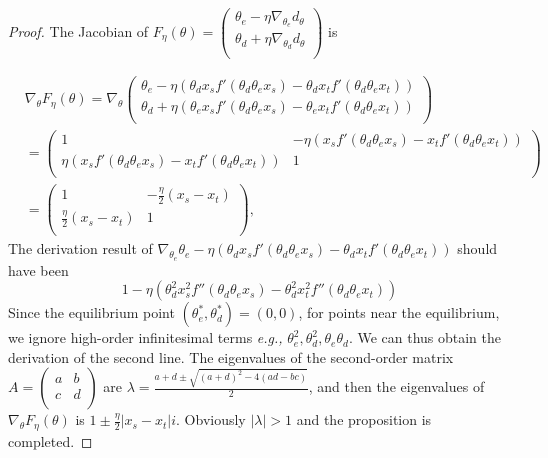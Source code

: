 \documentclass{article} \usepackage{iclr2023_conference,times}
\newcommand{\eg}[0]{\textit{e.g., }}
\begin{document}
\begin{proof}
The Jacobian of $F_\eta(\theta)=\left(         \begin{array}{c} 
    \theta_e-\eta\nabla_{\theta_e}d_{\theta} \\ 
    \theta_d+\eta\nabla_{\theta_d}d_{\theta}\\ 
  \end{array}\right)$ is
 
 \begin{equation}
 \begin{aligned}
&\nabla_{\theta}F_\eta(\theta)=\nabla_{\theta}\left(         \begin{array}{c} 
    \theta_e-\eta\left(\theta_dx_sf'(\theta_d\theta_ex_s)-\theta_dx_tf'(\theta_d\theta_ex_t)\right) \\ 
    \theta_d+\eta\left(\theta_ex_sf'(\theta_d\theta_ex_s)-\theta_ex_tf'(\theta_d\theta_ex_t)\right)\\ 
  \end{array}\right)\\
 &=\left(         \begin{array}{cc} 
    1&-\eta\left(x_sf'(\theta_d\theta_ex_s)-x_tf'(\theta_d\theta_ex_t)\right) \\ 
    \eta\left(x_sf'(\theta_d\theta_ex_s)-x_tf'(\theta_d\theta_ex_t)\right)&1\\ 
  \end{array}\right)\\
  &=\left(         \begin{array}{cc} 
    1&-\frac{\eta}{2}\left(x_s-x_t\right) \\ 
    \frac{\eta}{2}\left(x_s-x_t\right)&1\\ 
  \end{array}\right),
 \end{aligned}
\end{equation}
The derivation result of $\nabla_{\theta_e} \theta_e-\eta\left(\theta_dx_sf'(\theta_d\theta_ex_s)-\theta_dx_tf'(\theta_d\theta_ex_t)\right)$ should have been 
\begin{equation}
    1-\eta\left(\theta^2_dx^2_sf''(\theta_d\theta_ex_s)-\theta^2_dx^2_tf''(\theta_d\theta_ex_t)\right)
\end{equation}
Since the equilibrium point $(\theta_e^*,\theta_d^*)=(0,0)$, for points near the equilibrium, we ignore high-order infinitesimal terms \eg  $\theta_e^2,\theta_d^2,\theta_e\theta_d$. We can thus obtain the derivation of the second line. The eigenvalues of the second-order matrix $A=\left(         \begin{array}{cc} 
    a&b \\ 
    c&d\\ 
  \end{array}\right)$ 
are $\lambda=\frac{a+d\pm\sqrt{(a+d)^2-4(ad-bc)}}{2}$, and then the eigenvalues of $\nabla_{\theta}F_\eta(\theta)$ is $1\pm \frac{\eta}{2}|x_s-x_t|i$. Obviously $|\lambda|>1$ and the proposition is completed.
\end{proof}
\end{document}
